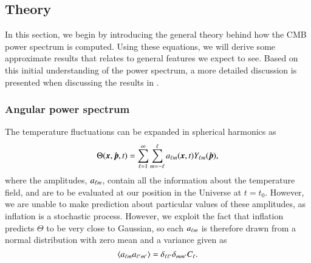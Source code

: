 \subsection{Theory}\label{ssec:M4:theory}
In this section, we begin by introducing the general theory behind how the CMB power spectrum is computed. Using these equations, we will derive some approximate results that relates to general features we expect to see. Based on this initial understanding of the power spectrum, a more detailed discussion is presented when discussing the results in .      

\subsubsection{Angular power spectrum} \label{sssec:M4:theory:angular_power_spectrum}
The temperature fluctuations can be expanded in spherical harmonics as
\begin{equation} \label{eq:M4:theory:theta_expansion_in_spherical_harmonics}
    \Theta(\boldsymbol{x}, \hat{\boldsymbol{p}}, t) = \sum_{\ell=1}^{\infty} \sum_{m=-\ell}^{\ell} a_{\ell m}(\boldsymbol{x}, t) Y_{\ell m}(\hat{\boldsymbol{p}}), 
\end{equation}
where the amplitudes, $a_{\ell m}$, contain all the information about the temperature field, and are to be evaluated at our position in the Universe at $t=t_0$. However, we are unable to make prediction about particular values of these amplitudes, as inflation is a stochastic process. However, we exploit the fact that inflation predicts $\Theta$ to be very close to Gaussian, so each $a_{\ell m}$ is therefore drawn from a normal distribution with zero mean and a variance given as 
\begin{equation} \label{eq:M4:theory:variance_of_alms}
    \expval{a_{\ell m}a_{\ell' m'}} = \delta_{\ell \ell'} \delta_{m m'} C_\ell.
\end{equation} 

